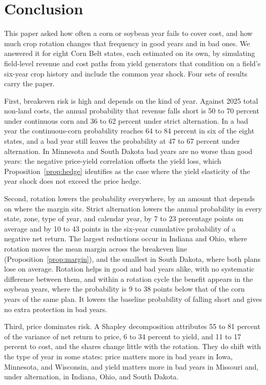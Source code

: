 \documentclass[11pt,letterpaper]{article}
\theoremstyle{remark}
\begin{document}
\section{\label{sec:conclusion}Conclusion}

This paper asked how often a corn or soybean year fails to cover cost, and how much crop rotation changes that frequency in good years and in bad ones. We answered it for eight Corn Belt states, each estimated on its own, by simulating field-level revenue and cost paths from yield generators that condition on a field's six-year crop history and include the common year shock. Four sets of results carry the paper.

First, breakeven risk is high and depends on the kind of year. Against 2025 total non-land costs, the annual probability that revenue falls short is 50 to 70 percent under continuous corn and 36 to 62 percent under strict alternation. In a bad year the continuous-corn probability reaches 64 to 84 percent in six of the eight states, and a bad year still leaves the probability at 47 to 67 percent under alternation. In Minnesota and South Dakota bad years are no worse than good years: the negative price-yield correlation offsets the yield loss, which Proposition~\ref{prop:hedge} identifies as the case where the yield elasticity of the year shock does not exceed the price hedge.

Second, rotation lowers the probability everywhere, by an amount that depends on where the margin sits. Strict alternation lowers the annual probability in every state, zone, type of year, and calendar year, by 7 to 23 percentage points on average and by 10 to 43 points in the six-year cumulative probability of a negative net return. The largest reductions occur in Indiana and Ohio, where rotation moves the mean margin across the breakeven line (Proposition~\ref{prop:margin}), and the smallest in South Dakota, where both plans lose on average. Rotation helps in good and bad years alike, with no systematic difference between them, and within a rotation cycle the benefit appears in the soybean years, where the probability is 9 to 38 points below that of the corn years of the same plan. It lowers the baseline probability of falling short and gives no extra protection in bad years.

Third, price dominates risk. A Shapley decomposition attributes 55 to 81 percent of the variance of net return to price, 6 to 34 percent to yield, and 11 to 17 percent to cost, and the shares change little with the rotation. They do shift with the type of year in some states: price matters more in bad years in Iowa, Minnesota, and Wisconsin, and yield matters more in bad years in Missouri and, under alternation, in Indiana, Ohio, and South Dakota.
\end{document}
